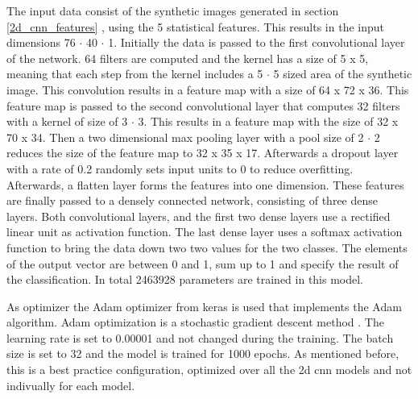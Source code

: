 The input data consist of the synthetic images generated in section \ref{2d_cnn_features} , using the 5 statistical features. This results in the input dimensions 76 $\cdot$ 40 $\cdot$ 1. Initially the data is passed to the first convolutional layer of the network. 64 filters are computed and the kernel has a size of 5 x 5, meaning that each step from the kernel includes a 5 $\cdot$ 5 sized area of the synthetic image. This convolution results in a feature map with a size of 64 x 72 x 36. This feature map is passed to the second convolutional layer that computes 32 filters with a kernel of size of 3 $\cdot$ 3. This results in a feature map with the size of 32 x 70 x 34. Then a two dimensional max pooling layer with a pool size of 2 $\cdot$ 2 reduces the size of the feature map to 32 x 35 x 17. Afterwards a dropout layer with a rate of 0.2 randomly sets input units to 0 to reduce overfitting. Afterwards, a flatten layer forms the features into one dimension. These features are finally passed to a densely connected network, consisting of three dense layers. Both convolutional layers, and the first two dense layers use a rectified linear unit as activation function. The last dense layer uses a softmax activation function to bring the data down two two values for the two classes. The elements of the output vector are between 0 and 1, sum up to 1 and specify the result of the classification. In total 2463928 parameters are trained in this model.

As optimizer the Adam optimizer from keras is used that implements the Adam algorithm. Adam optimization is a stochastic gradient descent method . The learning rate is set to 0.00001 and not changed during the training. The batch size is set to 32 and the model is trained for 1000 epochs. As mentioned before, this is a best practice configuration, optimized over all the 2d cnn models and not indivually for each model. 


